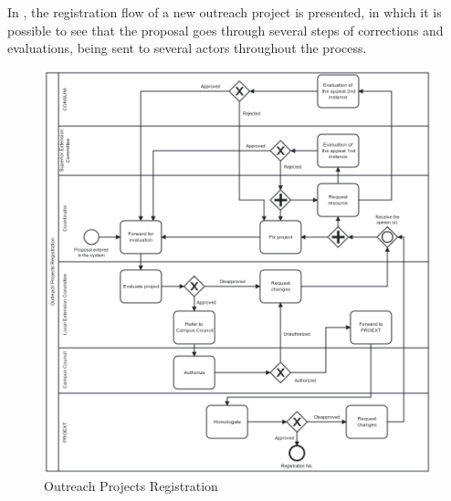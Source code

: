 
In , the registration flow of a new outreach project is presented, in which it is possible to see that the proposal goes through several steps of corrections and evaluations, being sent to several actors throughout the process.

\begin{figure}[htb]
  \caption{Outreach Projects Registration}\label{fig:outreach-projects-registration}
  \begin{center}
    \includegraphics[width=16cm]{img/3-registro-de-projetos-de-extensao.png}
  \end{center}
\end{figure}

